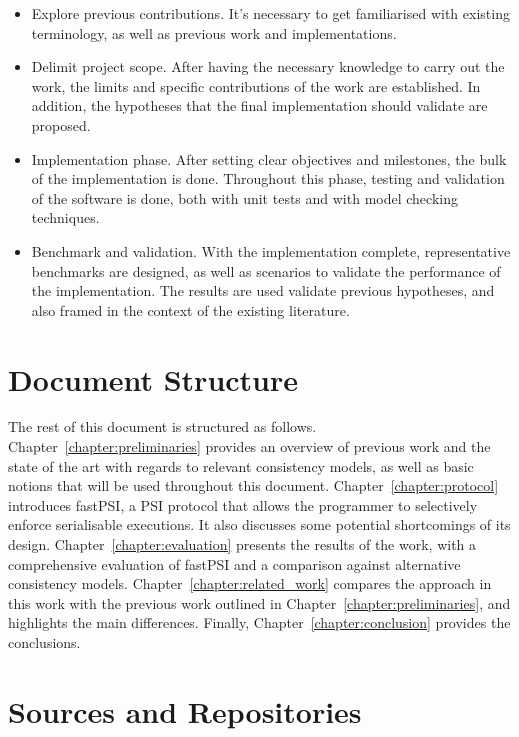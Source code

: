 \begin{itemize}
    \item Explore previous contributions. It's necessary to get familiarised with existing terminology, as well as previous work and implementations.

    \item Delimit project scope. After having the necessary knowledge to carry out the work, the limits and specific contributions of the work are established. In addition, the hypotheses that the final implementation should validate are proposed.

    \item Implementation phase. After setting clear objectives and milestones, the bulk of the implementation is done. Throughout this phase, testing and validation of the software is done, both with unit tests and with model checking techniques.

    \item Benchmark and validation. With the implementation complete, representative benchmarks are designed, as well as scenarios to validate the performance of the implementation. The results are used validate previous hypotheses, and also framed in the context of the existing literature.
\end{itemize}

\section{Document Structure}

The rest of this document is structured as follows. Chapter~\ref{chapter:preliminaries} provides an overview of previous work and the state of the art with regards to relevant consistency models, as well as basic notions that will be used throughout this document. Chapter~\ref{chapter:protocol} introduces fastPSI, a PSI protocol that allows the programmer to selectively enforce serialisable executions. It also discusses some potential shortcomings of its design. Chapter~\ref{chapter:evaluation} presents the results of the work, with a comprehensive evaluation of fastPSI and a comparison against alternative consistency models. Chapter~\ref{chapter:related_work} compares the approach in this work with the previous work outlined in Chapter~\ref{chapter:preliminaries}, and highlights the main differences. Finally, Chapter~\ref{chapter:conclusion} provides the conclusions.

\section{Sources and Repositories}

